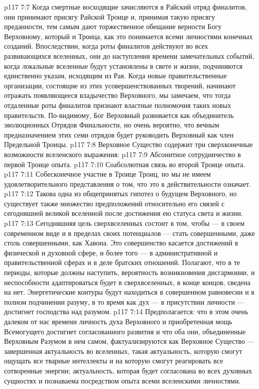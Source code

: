 \vs p117 7:7 \pc Когда смертные восходящие зачисляются в Райский отряд финалитов, они принимают присягу Райской Троице и, принимая такую присягу преданности, тем самым дают торжественное обещание верности Богу Верховному, который и  Троица, как это понимается всеми личностями конечных созданий. Впоследствии, когда роты финалитов действуют во всех развивающихся вселенных, они до наступления времени замечательных событий, когда локальные вселенные будут установлены в свете и жизни, подчиняются единственно указам, исходящим из Рая. Когда новые правительственные организации, состоящие из этих усовершенствованных творений, начинают отражать появляющееся владычество Верховного, мы замечаем, что тогда отдаленные роты финалитов признают властные полномочия таких новых правительств. По\hyp{}видимому, Бог Верховный развивается как объединитель эволюционных Отрядов Финальности, но очень вероятно, что вечным предназначением этих семи отрядов будет руководить Верховный как член Предельной Троицы.
\vs p117 7:8 \pc Верховное Существо содержит три сверхконечные возможности вселенского выражения:
\vs p117 7:9 \bibnobreakspace Абсонитное сотрудничество в первой Троице опыта.
\vs p117 7:10 \bibnobreakspace Соабсолютная связь во второй Троице опыта.
\vs p117 7:11 \bibnobreakspace Собесконечное участие в Троице Троиц, но мы не имеем удовлетворительного представления о том, что это в действительности означает.
\vs p117 7:12 \pc Такова одна из общепринятых гипотез о будущем Верховного, но существует также множество предположений относительно его связей с сегодняшней великой вселенной после достижения ею статуса света и жизни.
\vs p117 7:13 Сегодняшняя цель сверхвселенных состоит в том, чтобы --- в своем современном виде и в пределах своих потенциалов --- стать совершенными, даже столь совершенными, как Хавона. Это совершенство касается достижений в физической и духовной сфере, и более того --- в административной и правительственной сферах и в деле братских отношений. Полагают, что в те периоды, которые должны наступить, вероятность возникновения дисгармонии, и неспособности адаптироваться будет в сверхвселенных, в конце концов, сведена на нет. Энергетические контуры будут находиться в совершенном равновесии и в полном подчинении разуму, в то время как дух --- в присутствии личности --- достигнет господства над разумом.
\vs p117 7:14 Предполагается: что в этом очень далеком от нас времени личность духа Верховного и приобретенная мощь Всемогущего достигнет согласованного развития и что оба они, объединенные Верховным Разумом в нем самом, фактуализируются как Верховное Существо --- завершенная актуальность во вселенных, такая актуальность, которую смогут ощущать все тварные интеллекты и на которую смогут реагировать все сотворенные энергии; актуальность, которая будет согласована во всех духовных сущностях и познаваема посредством опыта всеми вселенскими личностями.
